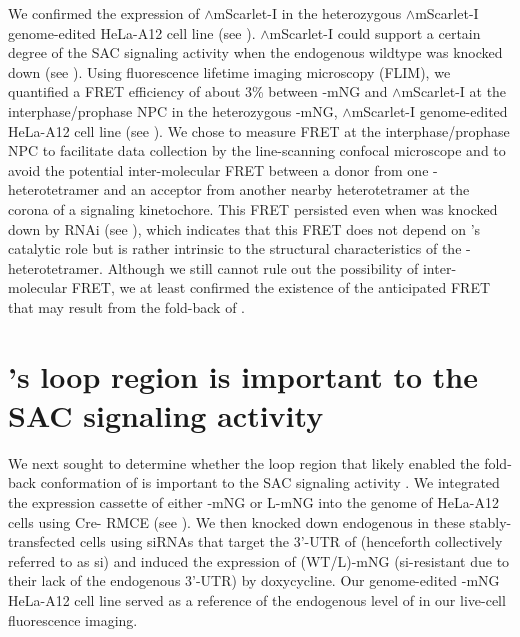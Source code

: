 We confirmed the expression of $\wedge$mScarlet-I in the heterozygous $\wedge$mScarlet-I genome-edited HeLa-A12 cell line (see ). $\wedge$mScarlet-I could support a certain degree of the SAC signaling activity when the endogenous wildtype  was knocked down (see ). Using fluorescence lifetime imaging microscopy (FLIM), we quantified a FRET efficiency of about 3\% between -mNG and $\wedge$mScarlet-I at the interphase/prophase NPC in the heterozygous -mNG, $\wedge$mScarlet-I genome-edited HeLa-A12 cell line (see ). We chose to measure FRET at the interphase/prophase NPC to facilitate data collection by the line-scanning confocal microscope and to avoid the potential inter-molecular FRET between a donor from one - heterotetramer and an acceptor from another nearby heterotetramer at the corona of a signaling kinetochore. This FRET persisted even when  was knocked down by RNAi (see ), which indicates that this FRET does not depend on 's catalytic role but is rather intrinsic to the structural characteristics of the - heterotetramer. Although we still cannot rule out the possibility of inter-molecular FRET, we at least confirmed the existence of the anticipated FRET that may result from the fold-back of  .

\section{'s loop region is important to the SAC signaling activity }
\label{LoopDeletionSection}

We next sought to determine whether the loop region that likely enabled the fold-back conformation of  is important to the SAC signaling activity . We integrated the expression cassette of either -mNG or \textDelta{}L-mNG into the genome of HeLa-A12 cells using Cre- RMCE (see ). We then knocked down endogenous  in these stably-transfected cells using siRNAs that target the 3'-UTR of  \cite{siMAD1-3UTR} (henceforth collectively referred to as si) and induced the expression of (WT/\textDelta{}L)-mNG (si-resistant due to their lack of the endogenous 3'-UTR) by doxycycline. Our genome-edited -mNG HeLa-A12 cell line served as a reference of the endogenous level of  in our live-cell fluorescence imaging.

